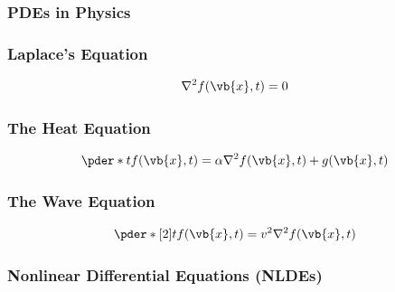     \subsubsection{PDEs in Physics} 
    \subsubsection{Laplace's Equation} %
    \begin{align}
        \nabla^2f(\vb{x},t)=0
    \end{align}
    \subsubsection{The Heat Equation} %
    \begin{align}
        \pder*{t}f(\vb{x},t)=\alpha\nabla^2{f}(\vb{x},t)+g(\vb{x},t)
    \end{align}
    \subsubsection{The Wave Equation} %
    \begin{align}
        \pder*[2]{t}f(\vb{x},t)=v^2\nabla^2f(\vb{x},t)
    \end{align}
%
\newpage
\subsubsection{Nonlinear Differential Equations (NLDEs)}